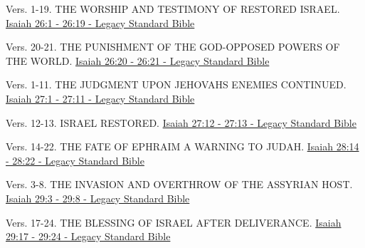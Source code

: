 \documentclass[
  ignorenonframetext,
]{beamer}
\begin{document}
\begin{frame}{26}
\label{section-56}
\begin{block}{Vers. 1-19. THE WORSHIP AND TESTIMONY OF RESTORED ISRAEL.}
\label{vers.-1-19.-the-worship-and-testimony-of-restored-israel.}
\href{https://read.lsbible.org/?q=is26\%3A1-19}{Isaiah 26:1 - 26:19 -
Legacy Standard Bible}
\end{block}

\begin{block}{Vers. 20-21. THE PUNISHMENT OF THE GOD-OPPOSED POWERS OF
THE WORLD.}
\label{vers.-20-21.-the-punishment-of-the-god-opposed-powers-of-the-world.}
\href{https://read.lsbible.org/?q=is26\%3A20-21}{Isaiah 26:20 - 26:21 -
Legacy Standard Bible}
\end{block}
\end{frame}

\begin{frame}{27}
\label{section-57}
\begin{block}{Vers. 1-11. THE JUDGMENT UPON JEHOVAH\textquotesingle S
ENEMIES CONTINUED.}
\label{vers.-1-11.-the-judgment-upon-jehovahs-enemies-continued.}
\href{https://read.lsbible.org/?q=is27\%3A1-11}{Isaiah 27:1 - 27:11 -
Legacy Standard Bible}
\end{block}

\begin{block}{Vers. 12-13. ISRAEL RESTORED.}
\label{vers.-12-13.-israel-restored.}
\href{https://read.lsbible.org/?q=is27\%3A12-13}{Isaiah 27:12 - 27:13 -
Legacy Standard Bible}
\end{block}
\end{frame}

\begin{frame}{28}
\label{section-58}
\begin{block}{Vers. 14-22. THE FATE OF EPHRAIM A WARNING TO JUDAH.}
\label{vers.-14-22.-the-fate-of-ephraim-a-warning-to-judah.}
\href{https://read.lsbible.org/?q=is28\%3A14-22}{Isaiah 28:14 - 28:22 -
Legacy Standard Bible}
\end{block}
\end{frame}

\begin{frame}{29}
\label{section-59}
\begin{block}{Vers. 3-8. THE INVASION AND OVERTHROW OF THE ASSYRIAN
HOST.}
\label{vers.-3-8.-the-invasion-and-overthrow-of-the-assyrian-host.}
\href{https://read.lsbible.org/?q=isa29\%3A3-8}{Isaiah 29:3 - 29:8 -
Legacy Standard Bible}
\end{block}

\begin{block}{Vers. 17-24. THE BLESSING OF ISRAEL AFTER DELIVERANCE.}
\label{vers.-17-24.-the-blessing-of-israel-after-deliverance.}
\href{https://read.lsbible.org/?q=isa29\%3A17-24}{Isaiah 29:17 - 29:24 -
Legacy Standard Bible}
\end{block}
\end{frame}
\end{document}
